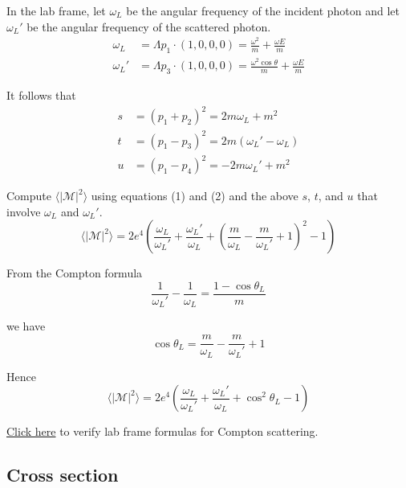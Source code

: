 \documentclass[12pt]{article}
\begin{document}
\noindent
In the lab frame, let $\omega_L$ be the angular frequency of the incident photon
and let $\omega_L'$ be the angular frequency of the scattered photon.
\begin{equation*}
\begin{aligned}
\omega_L&=\Lambda p_1\cdot(1,0,0,0)=\frac{\omega^2}{m}+\frac{\omega E}{m}
\\
\omega_L'&=\Lambda p_3\cdot(1,0,0,0)=\frac{\omega^2\cos\theta}{m}+\frac{\omega E}{m}
\end{aligned}
\end{equation*}

\noindent
It follows that
\begin{equation*}
\begin{aligned}
s&=(p_1+p_2)^2=2m\omega_L+m^2
\\
t&=(p_1-p_3)^2=2m(\omega_L' - \omega_L)
\\
u&=(p_1-p_4)^2=-2 m \omega_L' + m^2
\end{aligned}
\end{equation*}

\noindent
Compute $\langle|\mathcal{M}|^2\rangle$ using equations (1) and (2)
and the above $s$, $t$, and $u$ that involve $\omega_L$ and $\omega_L'$.
\begin{equation*}
\langle|\mathcal{M}|^2\rangle=
2e^4\left(
\frac{\omega_L}{\omega_L'}+\frac{\omega_L'}{\omega_L}
+\left(\frac{m}{\omega_L}-\frac{m}{\omega_L'}+1\right)^2-1
\right)
\end{equation*}

\noindent
From the Compton formula
\begin{equation*}
\frac{1}{\omega_L'}-\frac{1}{\omega_L}=\frac{1-\cos\theta_L}{m}
\end{equation*}

\noindent
we have
\begin{equation*}
\cos\theta_L=\frac{m}{\omega_L}-\frac{m}{\omega_L'}+1
\end{equation*}

\noindent
Hence
\begin{equation*}
\langle|\mathcal{M}|^2\rangle=
2e^4\left(
\frac{\omega_L}{\omega_L'}+\frac{\omega_L'}{\omega_L}+\cos^2\theta_L-1
\right)
\end{equation*}

\noindent
\href{https://georgeweigt.github.io/compton-scattering-3.html}{Click here}
to verify lab frame formulas for Compton scattering.

\subsection*{Cross section}
\end{document}

